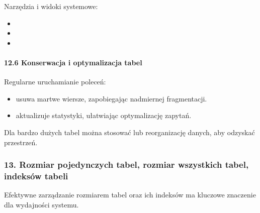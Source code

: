 \documentclass[letterpaper,10pt,polish]{sphinxmanual}
\begin{document}
\sphinxAtStartPar
Narzędzia i widoki systemowe:
\begin{itemize}
\item {} 
\sphinxAtStartPar
{}

\item {} 
\sphinxAtStartPar
{}

\item {} 
\sphinxAtStartPar
{}

\end{itemize}


\paragraph{12.6 Konserwacja i optymalizacja tabel}
\label{\detokenize{rozdzial2/Konfiguracja_baz_danych/Konfiguracja_baz_danych:konserwacja-i-optymalizacja-tabel}}
\sphinxAtStartPar
Regularne uruchamianie poleceń:
\begin{itemize}
\item {} 
\sphinxAtStartPar
{} \textendash{} usuwa martwe wiersze, zapobiegając nadmiernej fragmentacji.

\item {} 
\sphinxAtStartPar
{} \textendash{} aktualizuje statystyki, ułatwiając optymalizację zapytań.

\end{itemize}

\sphinxAtStartPar
Dla bardzo dużych tabel można stosować  lub reorganizację danych, aby odzyskać przestrzeń.


\subsubsection{13. Rozmiar pojedynczych tabel, rozmiar wszystkich tabel, indeksów tabeli}
\label{\detokenize{rozdzial2/Konfiguracja_baz_danych/Konfiguracja_baz_danych:rozmiar-pojedynczych-tabel-rozmiar-wszystkich-tabel-indeksow-tabeli}}
\sphinxAtStartPar
Efektywne zarządzanie rozmiarem tabel oraz ich indeksów ma kluczowe znaczenie dla wydajności systemu.
\end{document}
